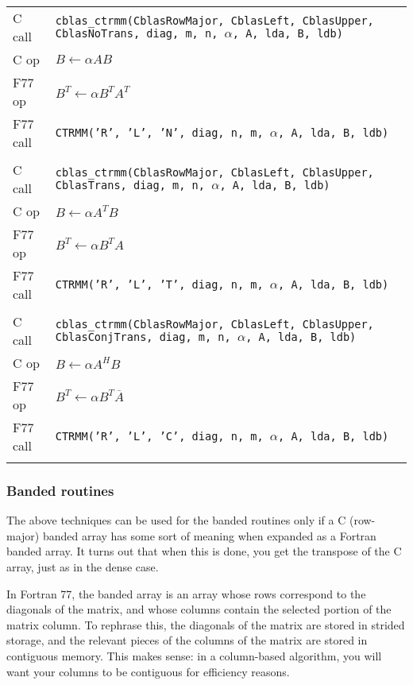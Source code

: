 \documentclass{article}
\begin{document}
{\footnotesize
\noindent
\begin{tabular}{ll}
C call   & {\tt cblas\_ctrmm(CblasRowMajor, CblasLeft, CblasUpper, CblasNoTrans, diag, m, n, $\alpha$, A, lda, B, ldb)}\\
C op     & $B \leftarrow \alpha A B$\\
F77 op   & $B^T \leftarrow \alpha B^T A^T$\\
F77 call & {\tt CTRMM('R', 'L', 'N', diag, n, m, $\alpha$, A, lda, B, ldb)}\\\\
%
C call   & {\tt cblas\_ctrmm(CblasRowMajor, CblasLeft, CblasUpper, CblasTrans, diag, m, n, $\alpha$, A, lda, B, ldb)}\\
C op     & $B \leftarrow \alpha A^T B$\\
F77 op   & $B^T \leftarrow \alpha B^T A$\\
F77 call & {\tt CTRMM('R', 'L', 'T', diag, n, m, $\alpha$, A, lda, B, ldb)}\\\\
%
C call   & {\tt cblas\_ctrmm(CblasRowMajor, CblasLeft, CblasUpper, CblasConjTrans, diag, m, n, $\alpha$, A, lda, B, ldb)}\\
C op     & $B \leftarrow \alpha A^H B$\\
F77 op   & $B^T \leftarrow \alpha B^T \overline{A}$\\
F77 call & {\tt CTRMM('R', 'L', 'C', diag, n, m, $\alpha$, A, lda, B, ldb)}\\\\
\end{tabular}
}

\subsubsection{Banded routines}\label{cint:banded}
The above techniques can be used for the banded routines only if a C (row-major)
banded array has some sort of meaning when expanded as a Fortran banded
array.  It turns out that when this is done, you get the transpose of
the C array, just as in the dense case.

In Fortran 77, the banded array is an array whose rows correspond to
the diagonals of the matrix, and whose columns contain the selected portion
of the matrix column.  To rephrase this, the diagonals of the matrix are
stored in strided storage, and the relevant pieces of the columns of the
matrix are stored in contiguous memory.  This makes sense: in a column-based
algorithm, you will want your columns to be contiguous for efficiency 
reasons.
\end{document}
